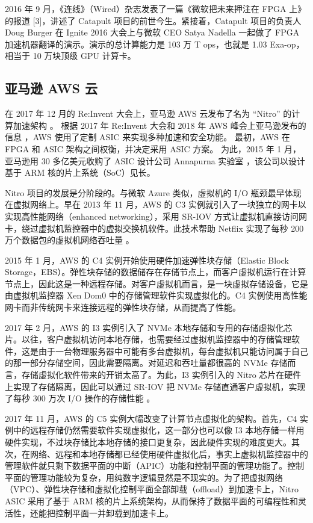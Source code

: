 2016 年 9 月，《连线》（Wired）杂志发表了一篇《微软把未来押注在 FPGA 上》的报道 [3]，讲述了 Catapult 项目的前世今生。紧接着，Catapult 项目的负责人 Doug Burger 在 Ignite 2016 大会上与微软 CEO Satya Nadella 一起做了 FPGA 加速机器翻译的演示。演示的总计算能力是 103 万 T ops，也就是 1.03 Exa-op，相当于 10 万块顶级 GPU 计算卡。



\subsection{亚马逊 AWS 云}

在 2017 年 12 月的 Re:Invent 大会上，亚马逊 AWS 云发布了名为 ``Nitro'' 的计算加速架构 \cite{nitro-blog}。
根据 2017 年 Re:Invent 大会和 2018 年 AWS 峰会上亚马逊发布的信息 \cite{nitro-talk,nitro-web}，AWS 使用了定制 ASIC 来实现多种加速和安全功能。
最初，AWS 在 FPGA 和 ASIC 架构之间权衡，并决定采用 ASIC 方案。
为此，2015 年 1 月，亚马逊用 30 多亿美元收购了 ASIC 设计公司 Annapurna 实验室 \cite{annapurna}，该公司以设计基于 ARM 核的片上系统（SoC）见长。

Nitro 项目的发展是分阶段的。与微软 Azure 类似，虚拟机的 I/O 瓶颈最早体现在虚拟网络上。早在 2013 年 11 月，AWS 的 C3 实例就引入了一块独立的网卡以实现高性能网络（enhanced networking），采用 SR-IOV 方式让虚拟机直接访问网卡，绕过虚拟机监控器中的虚拟交换机软件。此技术帮助 Netflix 实现了每秒 200 万个数据包的虚拟机网络吞吐量 \cite{netflix-aws}。

2015 年 1 月，AWS 的 C4 实例开始使用硬件加速弹性块存储（Elastic Block Storage，EBS）。弹性块存储的数据储存在存储节点上，而客户虚拟机运行在计算节点上，因此这是一种远程存储。对客户虚拟机而言，是一块虚拟存储设备，它是由虚拟机监控器 Xen Dom0 中的存储管理软件实现虚拟化的。C4 实例使用高性能网卡而非传统网卡来连接远程的弹性块存储，从而提高了性能。

2017 年 2 月，AWS 的 I3 实例引入了 NVMe 本地存储和专用的存储虚拟化芯片。以往，客户虚拟机访问本地存储，也需要经过虚拟机监控器中的存储管理软件，这是由于一台物理服务器中可能有多台虚拟机，每台虚拟机只能访问属于自己的那一部分存储空间，因此需要隔离。对延迟和吞吐量都很高的 NVMe 存储而言，存储虚拟化软件带来的开销太高了。为此，I3 实例引入的 Nitro 芯片在硬件上实现了存储隔离，因此可以通过 SR-IOV 把 NVMe 存储直通客户虚拟机，实现了每秒 300 万次 I/O 操作的存储性能 \cite{aws-local-storage}。

2017 年 11 月，AWS 的 C5 实例大幅改变了计算节点虚拟化的架构。首先，C4 实例中的远程存储仍然需要软件实现虚拟化，这一部分也可以像 I3 本地存储一样用硬件实现，不过块存储比本地存储的接口更复杂，因此硬件实现的难度更大。其次，在网络、远程和本地存储都已经使用硬件虚拟化后，事实上虚拟机监控器中的管理软件就只剩下数据平面的中断（APIC）功能和控制平面的管理功能了。控制平面的管理功能较为复杂，用纯数字逻辑显然是不现实的。为了把虚拟网络（VPC）、弹性块存储和虚拟化控制平面全部卸载（offload）到加速卡上，Nitro ASIC 采用了基于 ARM 核的片上系统架构，从而保持了数据平面的可编程性和灵活性，还能把控制平面一并卸载到加速卡上。

